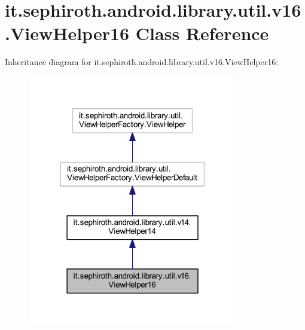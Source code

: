 \hypertarget{classit_1_1sephiroth_1_1android_1_1library_1_1util_1_1v16_1_1_view_helper16}{}\section{it.\+sephiroth.\+android.\+library.\+util.\+v16.\+View\+Helper16 Class Reference}
\label{classit_1_1sephiroth_1_1android_1_1library_1_1util_1_1v16_1_1_view_helper16}


Inheritance diagram for it.\+sephiroth.\+android.\+library.\+util.\+v16.\+View\+Helper16\+:
\nopagebreak
\begin{figure}[H]
\begin{center}
\leavevmode
\includegraphics[width=260pt]{classit_1_1sephiroth_1_1android_1_1library_1_1util_1_1v16_1_1_view_helper16__inherit__graph}
\end{center}
\end{figure}


